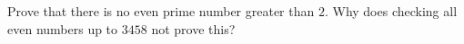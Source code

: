 Prove that there is no even prime number greater than $2$. Why does checking all even numbers up to $3458$ not prove this?
